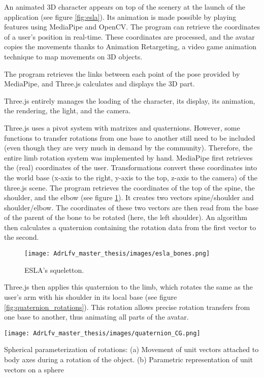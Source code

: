 An animated 3D character appears on top of the scenery at the launch of the application (see figure \ref{fig:esla}). Its animation is made possible by playing features using MediaPipe and OpenCV. The program can retrieve the coordinates of a user's position in real-time. These coordinates are processed, and the avatar copies the movements thanks to Animation Retargeting, a video game animation technique to map movements on 3D objects.

The program retrieves the links between each point of the pose provided by MediaPipe, and Three.js calculates and displays the 3D part. 

Three.js entirely manages the loading of the character, its display, its animation, the rendering, the light, and the camera.

Three.js uses a pivot system with matrixes and quaternions. However, some functions to transfer rotations from one base to
another still need to be included (even though they are very much in demand by the community). Therefore, the entire limb rotation system was implemented by hand.
MediaPipe first retrieves the (real) coordinates of the user. Transformations convert these coordinates into the world base (x-axis to the right, y-axis to the top, z-axis to the camera) of the three.js scene. The program retrieves the coordinates of the top of the spine, the shoulder, and the elbow (see figure \ref{fig:esla_bones}). It creates two vectors spine/shoulder and shoulder/elbow. The coordinates of these two vectors are then read from the base of the parent of the bone to be rotated (here, the left shoulder). An algorithm then calculates a quaternion containing the rotation data from the first vector to the second.

\begin{figure}[h]
    \centering
    \texttt{[image: AdrLfv\_master\_thesis/images/esla\_bones.png]}
    \caption{ESLA's squeletton.}
    \label{fig:esla_bones}
\end{figure}

Three.js then applies this quaternion to the limb, which rotates the same as the user's arm with his shoulder in its local base (see figure \ref{fig:quaternion_rotations}). This rotation allows precise rotation transfers from one base to another, thus animating all parts of the avatar.

\begin{marginfigure}
    \centering
    \texttt{[image: AdrLfv\_master\_thesis/images/quaternion\_CG.png]}
    \caption{Spherical parameterization of rotations: (a) Movement of unit vectors attached to body axes during a rotation of the object. (b) Parametric representation of unit vectors on a sphere \cite{what_when_how}}
    \label{fig:quaternion_rotations}
\end{marginfigure}


